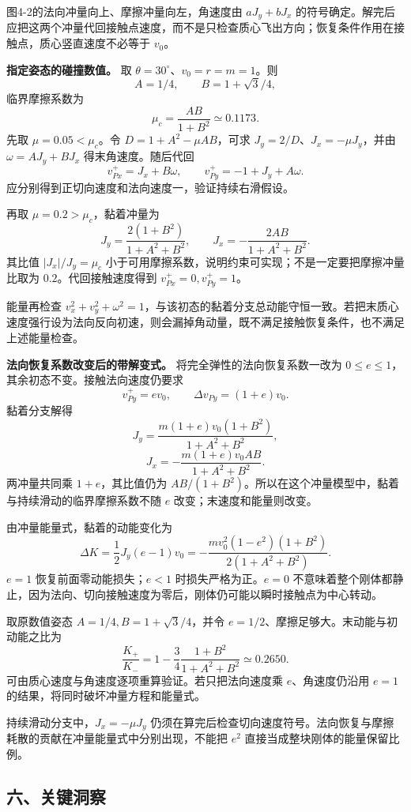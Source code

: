 \documentclass[12pt,a4paper,UTF8]{ctexart}
\begin{document}
图4-2的法向冲量向上、摩擦冲量向左，角速度由 \(aJ_y+bJ_x\)
的符号确定。解完后应把这两个冲量代回接触点速度，而不是只检查质心飞出方向；恢复条件作用在接触点，质心竖直速度不必等于
\(v_0\)。

\textbf{指定姿态的碰撞数值。} 取 \(\theta=30^\circ\)、\(v_0=r=m=1\)。则
\[
A=1/4,\qquad B=1+\sqrt3/4,
\] 临界摩擦系数为 \[
\mu_c=\frac{AB}{1+B^2}\simeq0.1173.
\] 先取 \(\mu=0.05<\mu_c\)。令 \(D=1+A^2-\mu AB\)，可求
\(J_y=2/D\)、\(J_x=-\mu J_y\)，并由 \(\omega=AJ_y+BJ_x\)
得末角速度。随后代回 \[
v_{Px}^+=J_x+B\omega,
\qquad v_{Py}^+=-1+J_y+A\omega.
\] 应分别得到正切向速度和法向速度一，验证持续右滑假设。

再取 \(\mu=0.2>\mu_c\)，黏着冲量为 \[
J_y=\frac{2(1+B^2)}{1+A^2+B^2},\qquad
J_x=-\frac{2AB}{1+A^2+B^2}.
\] 其比值 \(|J_x|/J_y=\mu_c\)
小于可用摩擦系数，说明约束可实现；不是一定要把摩擦冲量比取为
\(0.2\)。代回接触速度得到 \(v_{Px}^+=0,v_{Py}^+=1\)。

能量再检查
\(v_x^2+v_y^2+\omega^2=1\)，与该初态的黏着分支总动能守恒一致。若把末质心速度强行设为法向反向初速，则会漏掉角动量，既不满足接触恢复条件，也不满足上述能量检查。

\textbf{法向恢复系数改变后的带解变式。} 将完全弹性的法向恢复系数一改为
\(0\le e\le1\)，其余初态不变。接触法向速度仍要求 \[
v_{Py}^+=ev_0,\qquad
\Delta v_{Py}=(1+e)v_0.
\] 黏着分支解得 \[
J_y=\frac{m(1+e)v_0(1+B^2)}{1+A^2+B^2},
\] \[
J_x=-\frac{m(1+e)v_0AB}{1+A^2+B^2}.
\] 两冲量共同乘 \(1+e\)，其比值仍为
\(AB/(1+B^2)\)。所以在这个冲量模型中，黏着与持续滑动的临界摩擦系数不随
\(e\) 改变；末速度和能量则改变。

由冲量能量式，黏着的动能变化为 \[
\Delta K=\frac12J_y(e-1)v_0
=-\frac{mv_0^2(1-e^2)(1+B^2)}{2(1+A^2+B^2)}.
\] \(e=1\) 恢复前面零动能损失；\(e<1\) 时损失严格为正。\(e=0\)
不意味着整个刚体都静止，因为法向、切向接触速度为零后，刚体仍可能以瞬时接触点为中心转动。

取原数值姿态 \(A=1/4,B=1+\sqrt3/4\)，并令
\(e=1/2\)、摩擦足够大。末动能与初动能之比为 \[
\frac{K_+}{K_-}=1-
\frac34\frac{1+B^2}{1+A^2+B^2}\simeq0.2650.
\] 可由质心速度与角速度逐项重算验证。若只把法向速度乘
\(e\)、角速度仍沿用 \(e=1\) 的结果，将同时破坏冲量方程和能量式。

持续滑动分支中，\(J_x=-\mu J_y\)
仍须在算完后检查切向速度符号。法向恢复与摩擦耗散的贡献在冲量能量式中分别出现，不能把
\(e^2\) 直接当成整块刚体的能量保留比例。

\subsection{六、关键洞察}\label{ux516dux5173ux952eux6d1eux5bdf-3}
\end{document}
